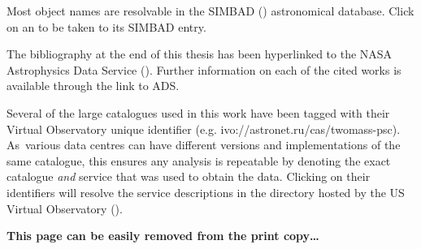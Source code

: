 \documentclass[a4paper,11pt,openright]{report}
\makeatletter
\renewcommand{\headrulewidth}{0pt}
\renewcommand{\footrulewidth}{0pt}
\def\cleardoublepage{\clearpage\if@twoside \ifodd\c@page\else
	\hbox{}
	\vspace*{\fill}
	\thispagestyle{empty}
	\newpage
	\if@twocolumn\hbox{}\newpage\fi\fi\fi}
\makeatother
\begin{document}
Most object names are resolvable in the SIMBAD () astronomical database. Click on an  to be taken to its SIMBAD entry.

The bibliography at the end of this thesis has been hyperlinked to the NASA Astrophysics Data Service (). Further information on each of the cited works is available through the link to ADS.

Several of the large catalogues used in this work have been tagged with their Virtual Observatory unique identifier (e.g. \mbox{ivo://astronet.ru/cas/twomass-psc}). As~various data centres can have different versions and implementations of the same catalogue, this ensures any analysis is repeatable by denoting the exact catalogue \emph{and} service that was used to obtain the data. Clicking on their identifiers will resolve the service descriptions in the  directory hosted by the US Virtual Observatory ().

\textbf{This page can be easily removed from the print copy\dots}



%

\cleardoublepage
\normalsize
%
%
\pagestyle{plain}
%
%
%

%
\cleardoublepage

%
\cleardoublepage

%
\setcounter{tocdepth}{1} %
\tableofcontents\cleardoublepage
{}
\listoffigures\cleardoublepage
{}
\listoftables\cleardoublepage

%
%

%
%
\pagestyle{fancy}
\fancyfoot{}
\renewcommand{\headrulewidth}{0.5pt}
\renewcommand{\footrulewidth}{0pt}
\end{document}
